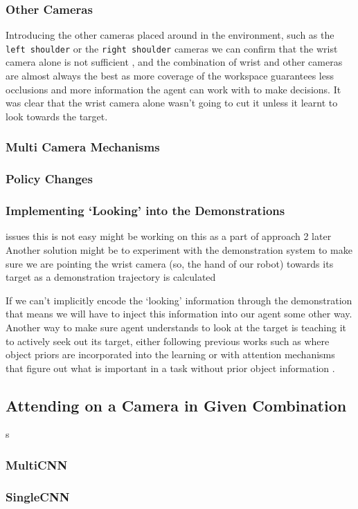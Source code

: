 \subsubsection{Other Cameras}
Introducing the other cameras placed around in the environment, such as the \verb|left shoulder| or the \verb|right shoulder| cameras we can confirm that the wrist camera alone is not sufficient , and the combination of wrist and other cameras are almost always the best as more coverage of the workspace guarantees less occlusions and more information the agent can work with to make decisions. It was clear that the wrist camera alone wasn't going to cut it unless it learnt to look towards the target.

\subsubsection{Multi Camera Mechanisms}
\subsubsection{Policy Changes}

\subsubsection{Implementing `Looking' into the Demonstrations}\label{ew-looking-at-target}
issues this is not easy might be working on this as a part of approach 2 later
Another solution might be to experiment with the demonstration system to make sure we are pointing the wrist camera (so, the hand of our robot) towards its target as a demonstration trajectory is calculated 

If we can't implicitly encode the `looking' information through the demonstration that means we will have to inject this information into our agent some other way. Another way to make sure agent understands to look at the target is teaching it to actively seek out its target, either following previous works such as  where object priors are incorporated into the learning or with attention mechanisms that figure out what is important in a task without prior object information .  


\subsection{Attending on a Camera in Given Combination}s
\subsubsection{MultiCNN}
\subsubsection{SingleCNN}